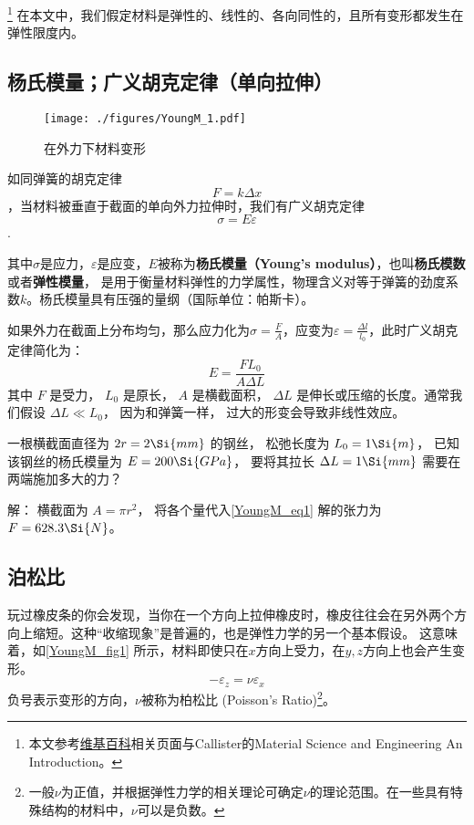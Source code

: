 
\begin{issues}
\issueDraft
\end{issues}

\footnote{本文参考\href{https://en.wikipedia.org/wiki/Young's_modulus}{维基百科}相关页面与Callister的Material Science and Engineering An Introduction。}
在本文中，我们假定材料是弹性的、线性的、各向同性的，且所有变形都发生在弹性限度内。

\subsection{杨氏模量；广义胡克定律（单向拉伸）}
\begin{figure}[ht]
\centering
\texttt{[image: ./figures/YoungM\_1.pdf]}
\caption{在外力下材料变形} \label{YoungM_fig1}
\end{figure}

如同弹簧的胡克定律$$F=k \Delta x$$，当材料被垂直于截面的单向外力拉伸时，我们有广义胡克定律$$\sigma = E \varepsilon$$.

其中$\sigma$是应力，$\varepsilon$是应变，$E$被称为\textbf{杨氏模量（Young's modulus）}，也叫\textbf{杨氏模数}或者\textbf{弹性模量}， 是用于衡量材料弹性的力学属性，物理含义对等于弹簧的劲度系数$k$。杨氏模量具有压强的量纲（国际单位：帕斯卡）。

如果外力在截面上分布均匀，那么应力化为$\sigma=\frac{F}{A}$，应变为$\varepsilon=\frac{\Delta l}{l_0}$，此时广义胡克定律简化为：
\begin{equation}\label{YoungM_eq1}
E = \frac{FL_0}{A\Delta L}
\end{equation}
其中 $F$ 是受力， $L_0$ 是原长， $A$ 是横截面积， $\Delta L$ 是伸长或压缩的长度。通常我们假设 $\Delta L \ll L_0$， 因为和弹簧一样， 过大的形变会导致非线性效应。

\begin{example}{}
一根横截面直径为 $2r = 2\Si{mm}$ 的钢丝， 松弛长度为 $L_0 = 1\Si{m}$， 已知该钢丝的杨氏模量为 $E = 200\Si{GPa}$， 要将其拉长 $\Delta L = 1\Si{mm}$ 需要在两端施加多大的力？

解： 横截面为 $A = \pi r^2$， 将各个量代入\autoref{YoungM_eq1} 解的张力为 $F = 628.3\Si{N}$。
\end{example}

\subsection{泊松比}
玩过橡皮条的你会发现，当你在一个方向上拉伸橡皮时，橡皮往往会在另外两个方向上缩短。这种“收缩现象”是普遍的，也是弹性力学的另一个基本假设。%
这意味着，如\autoref{YoungM_fig1} 所示，材料即使只在$x$方向上受力，在$y,z$方向上也会产生变形。
$$-\varepsilon_z= \nu \varepsilon_x$$
负号表示变形的方向，$\nu$被称为柏松比 (Poisson's Ratio)\footnote{一般$\nu$为正值，并根据弹性力学的相关理论可确定$\nu$的理论范围。在一些具有特殊结构的材料中，$\nu$可以是负数。}。%


